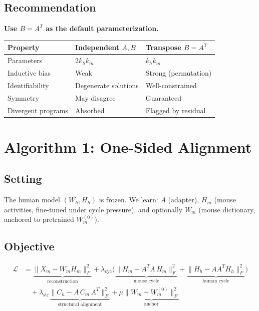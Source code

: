 \documentclass[10pt,twocolumn,letterpaper]{article}
\begin{document}
\subsection{Recommendation}

\textbf{Use $B = A^T$ as the default parameterization.}

\begin{table}[h]
\centering\small
\begin{tabular}{@{}lll@{}}
\toprule
Property & Independent $A, B$ & Transpose $B = A^T$ \\
\midrule
Parameters & $2 k_h k_m$ & $k_h k_m$ \\
Inductive bias & Weak & Strong (permutation) \\
Identifiability & Degenerate solutions & Well-constrained \\
Symmetry & May disagree & Guaranteed \\
Divergent programs & Absorbed & Flagged by residual \\
\bottomrule
\end{tabular}
\end{table}

\section{Algorithm 1: One-Sided Alignment}

\subsection{Setting}

The human model $(W_h, H_h)$ is frozen. We learn: $A$ (adapter),
$H_m$ (mouse activities, fine-tuned under cycle pressure), and optionally
$W_m$ (mouse dictionary, anchored to pretrained $W_m^{(0)}$).

\subsection{Objective}

\begin{align}
  \mathcal{L} &= \underbrace{\|X_m - W_m H_m\|_F^2}_{\text{reconstruction}}
  + \lambda_{\text{cyc}} \Big(
    \underbrace{\|H_m - A^T\!A\,H_m\|_F^2}_{\text{mouse cycle}}
    + \underbrace{\|H_h - AA^T\!H_h\|_F^2}_{\text{human cycle}}
  \Big) \nonumber\\
  &\quad + \lambda_{\text{str}}
    \underbrace{\|C_h - A\,C_m\,A^T\|_F^2}_{\text{structural alignment}}
  + \mu \underbrace{\|W_m - W_m^{(0)}\|_F^2}_{\text{anchor}}
\end{align}
\end{document}
